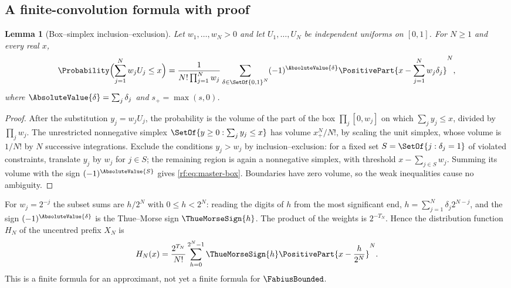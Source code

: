 \documentclass[11pt,oneside]{article}
\theoremstyle{plain}
\newtheorem{lemma}[theorem]{Lemma}
\theoremstyle{definition}
\theoremstyle{remark}
\newcommand{\Fb}{\FabiusBounded}            %
\newcommand{\tm}[1]{\ThueMorseSign{#1}}     %
\newcommand{\Prob}{\Probability}
\newcommand{\Tr}[1]{T_{#1}}                 %
\begin{document}
\subsection{A finite-convolution formula with proof}
\label{rf:sec:master-box}

\begin{lemma}[Box--simplex inclusion--exclusion]
\label{rf:lem:master-box}
Let $w_{1},\ldots,w_{N}>0$ and let $U_{1},\ldots,U_{N}$ be independent
uniforms on $[0,1]$.  For $N\ge1$ and every real $x$,
\begin{equation}
 \Prob\Bigl(\sum_{j=1}^{N}w_{j}U_{j}\le x\Bigr)
 =\frac{1}{N!\prod_{j=1}^{N}w_{j}}
  \sum_{\delta\in\SetOf{0,1}^{N}}(-1)^{\AbsoluteValue{\delta}}
  \PositivePart{x-\sum_{j=1}^{N}w_{j}\delta_{j}}^{N},
 \label{rf:eq:master-box}
\end{equation}
where $\AbsoluteValue{\delta}=\sum_{j}\delta_{j}$ and $s_{+}=\max(s,0)$.
\end{lemma}

\begin{proof}
After the substitution $y_{j}=w_{j}U_{j}$, the probability is the volume of
the part of the box $\prod_{j}[0,w_{j}]$ on which $\sum_{j}y_{j}\le x$,
divided by $\prod_{j}w_{j}$.  The unrestricted nonnegative simplex
$\SetOf{y\ge0:\sum_{j}y_{j}\le x}$ has volume $x_{+}^{N}/N!$, by scaling the
unit simplex, whose volume is $1/N!$ by $N$ successive integrations.  Exclude
the conditions $y_{j}>w_{j}$ by inclusion--exclusion: for a fixed set
$S=\SetOf{j:\delta_{j}=1}$ of violated constraints, translate $y_{j}$ by
$w_{j}$ for $j\in S$; the remaining region is again a nonnegative simplex,
with threshold $x-\sum_{j\in S}w_{j}$.  Summing its volume with the sign
$(-1)^{\AbsoluteValue{S}}$ gives \cref{rf:eq:master-box}.  Boundaries have
zero volume, so the weak inequalities cause no ambiguity.
\end{proof}

For $w_{j}=2^{-j}$ the subset sums are $h/2^{N}$ with $0\le h<2^{N}$: reading
the digits of $h$ from the most significant end, $h=\sum_{j=1}^{N}\delta_{j}2^{N-j}$,
and the sign $(-1)^{\AbsoluteValue{\delta}}$ is the Thue--Morse sign
$\tm{h}$.  The product of the weights is $2^{-\Tr{N}}$.  Hence the
distribution function $H_{N}$ of the uncentred prefix $X_{N}$ is
\begin{equation}
 H_{N}(x)=\frac{2^{\Tr{N}}}{N!}\sum_{h=0}^{2^{N}-1}\tm{h}
  \PositivePart{x-\frac{h}{2^{N}}}^{N}.
 \label{rf:eq:master-uncentred-spline}
\end{equation}
This is a finite formula for an approximant, not yet a finite formula for
$\Fb$.
\end{document}
